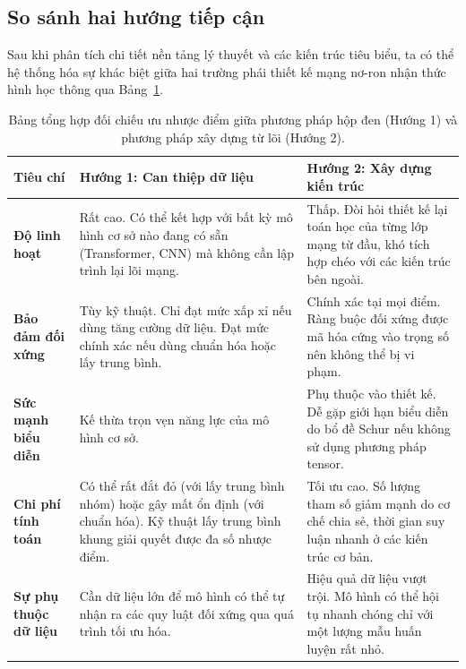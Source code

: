 \subsection{So sánh hai hướng tiếp cận}
\label{subsec:comparison}

Sau khi phân tích chi tiết nền tảng lý thuyết và các kiến trúc tiêu biểu, ta có thể hệ thống hóa sự khác biệt giữa hai trường phái thiết kế mạng nơ-ron nhận thức hình học thông qua Bảng~\ref{tab:comparison-approaches}.

\begin{table}[H]
\centering
\small
\renewcommand{\arraystretch}{1.3}
\begin{tabular}{p{} p{} p{}}
\toprule
\textbf{Tiêu chí} & \textbf{Hướng 1: Can thiệp dữ liệu} & \textbf{Hướng 2: Xây dựng kiến trúc} \\
\midrule
\textbf{Độ linh hoạt} & Rất cao. Có thể kết hợp với bất kỳ mô hình cơ sở nào đang có sẵn (Transformer, CNN) mà không cần lập trình lại lõi mạng. & Thấp. Đòi hỏi thiết kế lại toán học của từng lớp mạng từ đầu, khó tích hợp chéo với các kiến trúc bên ngoài. \\
\textbf{Bảo đảm đối xứng} & Tùy kỹ thuật. Chỉ đạt mức xấp xỉ nếu dùng tăng cường dữ liệu. Đạt mức chính xác nếu dùng chuẩn hóa hoặc lấy trung bình. & Chính xác tại mọi điểm. Ràng buộc đối xứng được mã hóa cứng vào trọng số nên không thể bị vi phạm. \\
\textbf{Sức mạnh biểu diễn} & Kế thừa trọn vẹn năng lực của mô hình cơ sở. & Phụ thuộc vào thiết kế. Dễ gặp giới hạn biểu diễn do bổ đề Schur nếu không sử dụng phương pháp tensor. \\
\textbf{Chi phí tính toán} & Có thể rất đắt đỏ (với lấy trung bình nhóm) hoặc gây mất ổn định (với chuẩn hóa). Kỹ thuật lấy trung bình khung giải quyết được đa số nhược điểm. & Tối ưu cao. Số lượng tham số giảm mạnh do cơ chế chia sẻ, thời gian suy luận nhanh ở các kiến trúc cơ bản. \\
\textbf{Sự phụ thuộc dữ liệu} & Cần dữ liệu lớn để mô hình có thể tự nhận ra các quy luật đối xứng qua quá trình tối ưu hóa. & Hiệu quả dữ liệu vượt trội. Mô hình có thể hội tụ nhanh chóng chỉ với một lượng mẫu huấn luyện rất nhỏ. \\
\bottomrule
\end{tabular}
\caption{Bảng tổng hợp đối chiếu ưu nhược điểm giữa phương pháp hộp đen (Hướng 1) và phương pháp xây dựng từ lõi (Hướng 2).}
\label{tab:comparison-approaches}
\end{table}

